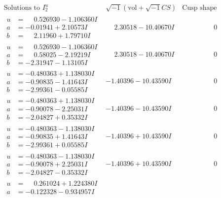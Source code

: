 \documentclass[1p]{elsarticle_modified}
\theoremstyle{definition}
\newcommand{\I}{\sqrt{-1}}
\begin{document}
$$\begin{array}{c|c|c}
\text{Solutions to }I^u_{2}& \I (\text{vol} + \sqrt{-1}CS) & \text{Cusp shape}\\
 \hline 
\begin{aligned}
u &= \phantom{-}0.526930 - 1.106360 I \\
a &= -0.01941 + 2.10573 I \\
b &= \phantom{-}2.11960 + 1.79710 I\end{aligned}
 & \phantom{-}2.30518 - 10.40670 I & \phantom{-0.000000 } 0 \\ \hline\begin{aligned}
u &= \phantom{-}0.526930 - 1.106360 I \\
a &= \phantom{-}0.58025 - 2.19219 I \\
b &= -2.31947 - 1.13105 I\end{aligned}
 & \phantom{-}2.30518 - 10.40670 I & \phantom{-0.000000 } 0 \\ \hline\begin{aligned}
u &= -0.480363 + 1.138030 I \\
a &= -0.90835 - 1.41643 I \\
b &= -2.99361 - 0.05585 I\end{aligned}
 & -1.40396 - 10.43590 I & \phantom{-0.000000 } 0 \\ \hline\begin{aligned}
u &= -0.480363 + 1.138030 I \\
a &= -0.90078 - 2.25031 I \\
b &= -2.04827 + 0.35332 I\end{aligned}
 & -1.40396 - 10.43590 I & \phantom{-0.000000 } 0 \\ \hline\begin{aligned}
u &= -0.480363 - 1.138030 I \\
a &= -0.90835 + 1.41643 I \\
b &= -2.99361 + 0.05585 I\end{aligned}
 & -1.40396 + 10.43590 I & \phantom{-0.000000 } 0 \\ \hline\begin{aligned}
u &= -0.480363 - 1.138030 I \\
a &= -0.90078 + 2.25031 I \\
b &= -2.04827 - 0.35332 I\end{aligned}
 & -1.40396 + 10.43590 I & \phantom{-0.000000 } 0 \\ \hline\begin{aligned}
u &= \phantom{-}0.261024 + 1.224380 I \\
a &= -0.122328 - 0.934957 I \\

\end{aligned}
\end{array}$$
\end{document}
